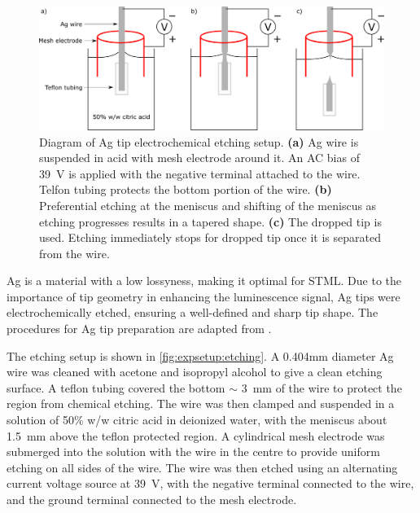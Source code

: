 \begin{figure} [h]
    \centering
    
    \includegraphics[width=\textwidth]{pictures/etch_diagram.png}
    
    \caption{Diagram of Ag tip electrochemical etching setup. \textbf{(a)} Ag wire is suspended in acid with mesh electrode around it. An AC bias of \SI{39}{V} is applied with the negative terminal attached to the wire. Telfon tubing protects the bottom portion of the wire. \textbf{(b)} Preferential etching at the meniscus and shifting of the meniscus as etching progresses results in a tapered shape. \textbf{(c)} The dropped tip is used. Etching immediately stops for dropped tip once it is separated from the wire. }
    \label{fig:expsetup:etching}
\end{figure}

Ag is a material with a low lossyness, making it optimal for \ac{STML}. Due to the importance of tip geometry in enhancing the luminescence signal, Ag tips were electrochemically etched, ensuring a well-defined and sharp tip shape. The procedures for Ag tip preparation are adapted from \citep{roussy2016coupling, zhang2011fabrication}. 

The etching setup is shown in \autoref{fig:expsetup:etching}. A 0.404mm diameter Ag wire was cleaned with acetone and isopropyl alcohol to give a clean etching surface. A teflon tubing covered the bottom $\sim$ \SI{3}{mm} of the wire to protect the region from chemical etching. The wire was then clamped and suspended in a solution of 50\% w/w citric acid in deionized water, with the meniscus about \SI{1.5}{mm} above the teflon protected region. A cylindrical mesh electrode was submerged into the solution with the wire in the centre to provide uniform etching on all sides of the wire. The wire was then etched using an alternating current voltage source at \SI{39}{V}, with the negative terminal connected to the wire, and the ground terminal connected to the mesh electrode. 


